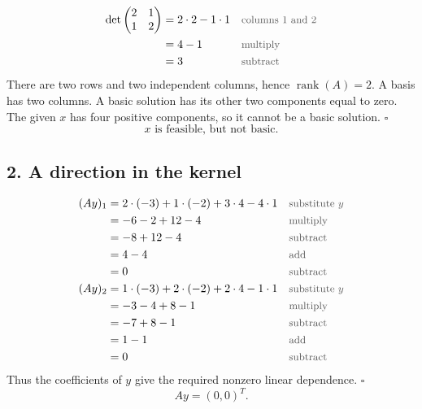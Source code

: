 \documentclass[a4paper,11pt]{article}
\newif\ifexplain
\newcommand{\teil}[1]{\subsection*{#1}}
\newcommand{\why}[1]{\text{\small\color{black!65}#1}}
\newcommand{\explain}[1]{\ifexplain\begin{erklbox}#1\end{erklbox}\fi}
\begin{document}
\begin{align*}
\det\begin{pmatrix}2&1\\1&2\end{pmatrix}&=2\cdot2-1\cdot1&&\why{columns 1 and 2}\\
&=4-1&&\why{multiply}\\
&=3&&\why{subtract}
\end{align*}
There are two rows and two independent columns, hence $\operatorname{rank}(A)=2$.
A basis has two columns. A basic solution has its other two components equal to zero.
The given $x$ has four positive components, so it cannot be a basic solution. $\square$
\[\boxed{x\text{ is feasible, but not basic.}}\]
\explain{Eine Basislösung darf weniger als zwei positive Komponenten haben, wenn sie degeneriert ist. Mehr als zwei geht hier nicht: Mindestens die zwei Nichtbasisvariablen stehen auf null. Deshalb reicht die Anzahl positiver Komponenten aus, um den gegebenen Punkt auszuschließen.}

\teil{2. A direction in the kernel}
\begin{align*}
(Ay)_1&=2\cdot(-3)+1\cdot(-2)+3\cdot4-4\cdot1&&\why{substitute $y$}\\
&=-6-2+12-4&&\why{multiply}\\
&=-8+12-4&&\why{subtract}\\
&=4-4&&\why{add}\\
&=0&&\why{subtract}\\
(Ay)_2&=1\cdot(-3)+2\cdot(-2)+2\cdot4-1\cdot1&&\why{substitute $y$}\\
&=-3-4+8-1&&\why{multiply}\\
&=-7+8-1&&\why{subtract}\\
&=1-1&&\why{add}\\
&=0&&\why{subtract}
\end{align*}
Thus the coefficients of $y$ give the required nonzero linear dependence. $\square$
\[\boxed{Ay=(0,0)^T.}\]
\explain{Der Kern besteht aus den Richtungen, die $A$ auf null abbildet. Hier ist $y$ nicht der Nullvektor. Trotzdem heben sich die gewichteten Spalten auf. Wenn wir ein Vielfaches dieser Richtung von $x$ abziehen, bleibt die rechte Seite $b$ erhalten.}
\end{document}
